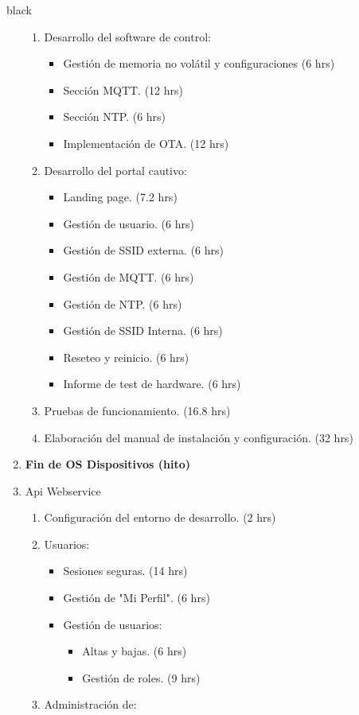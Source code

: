\documentclass[11pt]{charter}
\begin{document}
\begin{consigna}{black}
\begin{enumerate}
\begin{enumerate}
		\item Desarrollo del software de control:
		\begin{itemize}
			\item Gestión de memoria no volátil y configuraciones (6 hrs)
			\item Sección MQTT. (12 hrs)
			\item Sección NTP. (6 hrs)
			\item Implementación de OTA. (12 hrs)
		\end{itemize}
		\item Desarrollo del portal cautivo:
		\begin{itemize}
			\item Landing page. (7.2 hrs)
			\item Gestión de usuario. (6 hrs)
			\item Gestión de SSID externa. (6 hrs)
			\item Gestión de MQTT. (6 hrs)
			\item Gestión de NTP. (6 hrs)
			\item Gestión de SSID Interna. (6 hrs)
			\item Reseteo y reinicio. (6 hrs)
			\item Informe de test de hardware. (6 hrs)
		\end{itemize}
		\item Pruebas de funcionamiento. (16.8 hrs)
		\item Elaboración del manual de instalación y configuración. (32 hrs)
	\end{enumerate}
\item \textbf{Fin de OS Dispositivos (hito)}
\item Api Webservice
	\begin{enumerate}
		\item Configuración del entorno de desarrollo. (2 hrs)
		\item Usuarios:
			\begin{itemize}
				\item Sesiones seguras. (14 hrs)
				\item Gestión de "Mi Perfil". (6 hrs)
				\item Gestión de usuarios:
				\begin{itemize}
					\item Altas y bajas. (6 hrs) 
					\item Gestión de roles. (9 hrs)
				\end{itemize}
			\end{itemize}
		\item Administración de:

\end{enumerate}
\end{enumerate}
\end{consigna}
\end{document}
